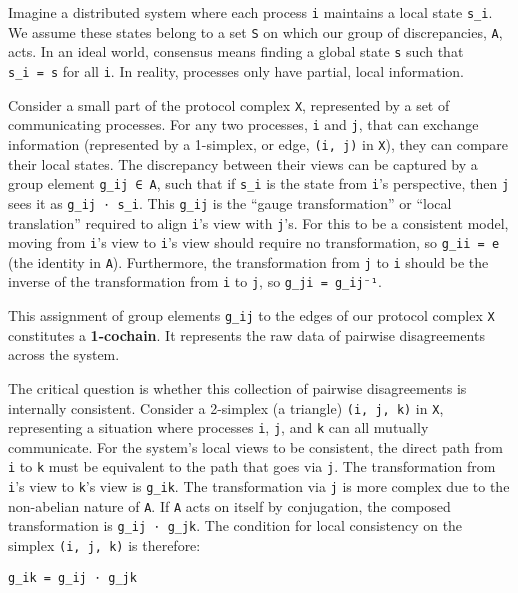 \documentclass[
]{article}
\begin{document}
Imagine a distributed system where each process \texttt{i} maintains a
local state \texttt{s\_i}. We assume these states belong to a set
\texttt{S} on which our group of discrepancies, \texttt{A}, acts. In an
ideal world, consensus means finding a global state \texttt{s} such that
\texttt{s\_i\ =\ s} for all \texttt{i}. In reality, processes only have
partial, local information.

Consider a small part of the protocol complex \texttt{X}, represented by
a set of communicating processes. For any two processes, \texttt{i} and
\texttt{j}, that can exchange information (represented by a 1-simplex,
or edge, \texttt{(i,\ j)} in \texttt{X}), they can compare their local
states. The discrepancy between their views can be captured by a group
element \texttt{g\_ij\ ∈\ A}, such that if \texttt{s\_i} is the state
from \texttt{i}'s perspective, then \texttt{j} sees it as
\texttt{g\_ij\ ⋅\ s\_i}. This \texttt{g\_ij} is the ``gauge
transformation'' or ``local translation'' required to align \texttt{i}'s
view with \texttt{j}'s. For this to be a consistent model, moving from
\texttt{i}'s view to \texttt{i}'s view should require no transformation,
so \texttt{g\_ii\ =\ e} (the identity in \texttt{A}). Furthermore, the
transformation from \texttt{j} to \texttt{i} should be the inverse of
the transformation from \texttt{i} to \texttt{j}, so
\texttt{g\_ji\ =\ g\_ij⁻¹}.

This assignment of group elements \texttt{g\_ij} to the edges of our
protocol complex \texttt{X} constitutes a \textbf{1-cochain}. It
represents the raw data of pairwise disagreements across the system.

The critical question is whether this collection of pairwise
disagreements is internally consistent. Consider a 2-simplex (a
triangle) \texttt{(i,\ j,\ k)} in \texttt{X}, representing a situation
where processes \texttt{i}, \texttt{j}, and \texttt{k} can all mutually
communicate. For the system's local views to be consistent, the direct
path from \texttt{i} to \texttt{k} must be equivalent to the path that
goes via \texttt{j}. The transformation from \texttt{i}'s view to
\texttt{k}'s view is \texttt{g\_ik}. The transformation via \texttt{j}
is more complex due to the non-abelian nature of \texttt{A}. If
\texttt{A} acts on itself by conjugation, the composed transformation is
\texttt{g\_ij\ ⋅\ g\_jk}. The condition for local consistency on the
simplex \texttt{(i,\ j,\ k)} is therefore:

\texttt{g\_ik\ =\ g\_ij\ ⋅\ g\_jk}
\end{document}
